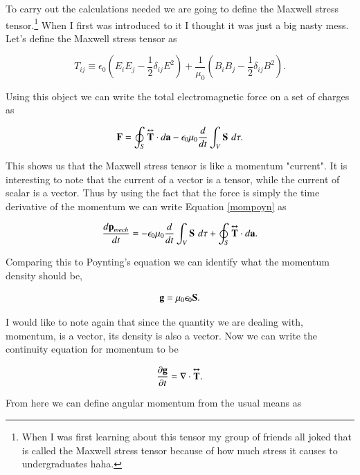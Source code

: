 \documentclass[preprint, review,12pt]{elsarticle}
\def\.{\cdot}
\def\b{\textbf}
\def\={\equiv}
\def\div{\nabla \.}
\newcommand{\pd}[2]{\frac{\partial #1 }{\partial #2}}
\newcommand{\td}[2]{\frac{d #1 }{d #2}}
\newcommand{\tup}[1]{\overset{\text{\tiny $\bm\leftrightarrow $}}{\b #1}}
\begin{document}
To carry out the calculations needed we are going to define the Maxwell stress tensor.\footnote{When I was first learning about this tensor my group of friends all joked that is called the Maxwell stress tensor because of how much stress it causes to undergraduates haha.} When I first was introduced to it I thought it was just a big nasty mess. Let's define the Maxwell stress tensor as

\begin{equation}
    T_{ij} \= \epsilon_0 (E_iE_j - \frac{1}{2}\delta_{ij}E^2) + \frac{1}{\mu_0}(B_iB_j - \frac{1}{2}\delta_{ij}B^2).
\end{equation}

Using this object we can write the total electromagnetic force on a set of charges as 

\begin{equation}
\label{mompoyn}
    \b F = \oint_S \tup{T} \. d\b a - \epsilon_0 \mu_0 \td{}{t} \int_V \b S \hspace{3.5pt} d\tau.
\end{equation}

This shows us that the Maxwell stress tensor is like a momentum "current". It is interesting to note that the current of a vector is a tensor, while the current of scalar is a vector. Thus by using the fact that the force is simply the time derivative of the momentum we can write Equation \ref{mompoyn} as 

\begin{equation}
    \td{\b p_{mech}}{t} = -\epsilon_0 \mu_0 \td{}{t}\int_V \b S \hspace{3.5pt} d\tau + \oint_S \tup{T} \. d\b a.
\end{equation}

Comparing this to Poynting's equation we can identify what the momentum density should be,

\begin{equation}
    \b g = \mu_0\epsilon_0 \b S.
\end{equation}

I would like to note again that since the quantity we are dealing with, momentum, is a vector, its density is also a vector. Now we can write the continuity equation for momentum to be

\begin{equation}
    \pd{\b g}{t} = \div \tup{T}.
\end{equation}

From here we can define angular momentum from the usual means as 
\end{document}
